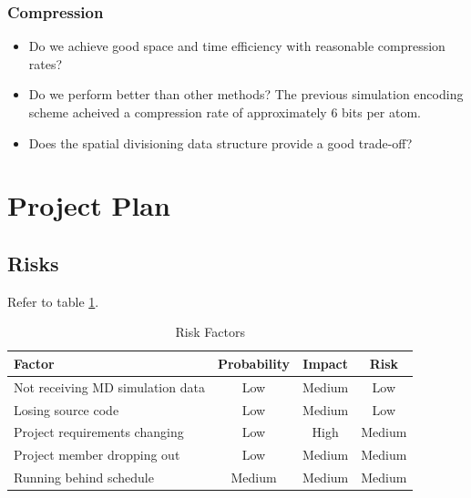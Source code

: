 \documentclass[a4paper,twocolumn]{article}
\begin{document}
\subsubsection*{Compression}
\begin{itemize}
 \item Do we achieve good space and time efficiency with reasonable compression rates? 
 \item Do we perform better than other methods? The previous simulation encoding scheme acheived a compression rate of approximately 6 bits per atom. \citep{omeltchenko2000sls}
 \item Does the spatial divisioning data structure provide a good trade-off? 
\end{itemize}




\section{Project Plan}

\subsection{Risks}
\label{sec:risksection}

Refer to table \ref{tab:riskfactors}.

\begin{table}[h]
  \begin{tabular}{|p{7cm}|c|c|c|}
    \hline
    \textbf{Factor} & \textbf{Probability} & \textbf{Impact} & \textbf{Risk} \\
    \hline
    
    Not receiving MD simulation data & Low & Medium & Low \\ \hline

    Losing source code & Low & Medium & Low \\ \hline
    
    Project requirements changing & Low & High & Medium \\ \hline
    
    Project member dropping out & Low & Medium & Medium \\ \hline

    Running behind schedule & Medium & Medium & Medium \\ \hline

  \end{tabular}
  \caption{Risk Factors}
  \label{tab:riskfactors}
\end{table}
\end{document}
